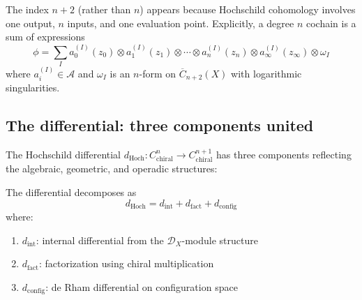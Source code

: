 The index $n+2$ (rather than $n$) appears because Hochschild cohomology involves one output, $n$ inputs, and one evaluation point. Explicitly, a degree $n$ cochain is a sum of expressions
\[
\phi = \sum_I a_0^{(I)}(z_0) \otimes a_1^{(I)}(z_1) \otimes \cdots \otimes a_n^{(I)}(z_n) \otimes a_{\infty}^{(I)}(z_{\infty}) \otimes \omega_I
\]
where $a_i^{(I)} \in \mathcal{A}$ and $\omega_I$ is an $n$-form on $\overline{C}_{n+2}(X)$ with logarithmic singularities.

\subsection{The differential: three components united}

The Hochschild differential
$d_{\mathrm{Hoch}}: C^n_{\text{chiral}} \to C^{n+1}_{\text{chiral}}$
has three components reflecting the algebraic, geometric, and operadic
structures:

\begin{theorem}
\label{thm:chiral-hochschild-differential}
The differential decomposes as
\[
d_{\mathrm{Hoch}} = d_{\text{int}} + d_{\text{fact}} + d_{\text{config}}
\]
where:
\begin{enumerate}
\item $d_{\text{int}}$: internal differential from the $\mathcal{D}_X$-module structure
\item $d_{\text{fact}}$: factorization using chiral multiplication  
\item $d_{\text{config}}$: de Rham differential on configuration space
\end{enumerate}
\end{theorem}

